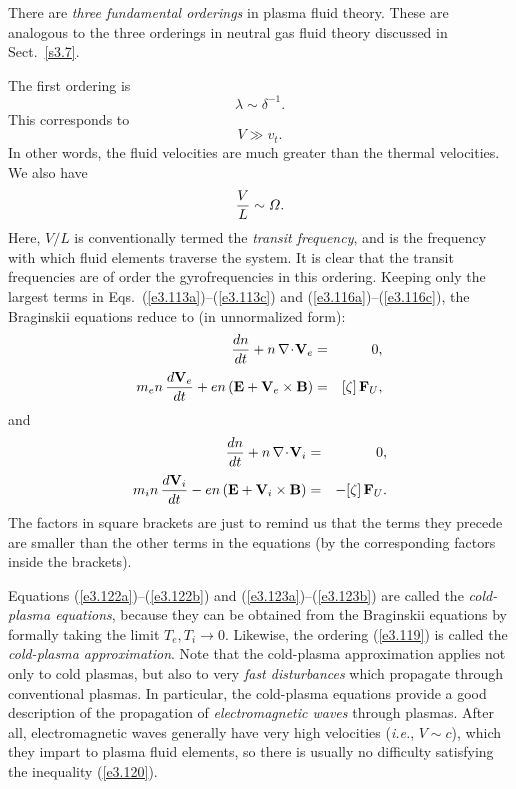 There are {\em three fundamental orderings}\/  in plasma fluid theory. These are
analogous to the three orderings in neutral gas fluid theory discussed in Sect.~\ref{s3.7}.

The first ordering is
\begin{equation}\label{e3.119}
\lambda \sim \delta^{-1}.
\end{equation}
This corresponds to
\begin{equation}\label{e3.120}
V\gg v_t.
\end{equation}
In other words, the fluid velocities are much greater than the 
thermal velocities. We also have
\begin{equation}\label{e3.121}
\frac{V}{L} \sim {\mit\Omega}.
\end{equation}
Here, $V/L$ is conventionally termed the {\em transit frequency}, and is
the frequency with which fluid elements traverse the system. It is clear
that the transit frequencies are of order the gyrofrequencies
in this ordering. Keeping only the largest terms in Eqs.~(\ref{e3.113a})--(\ref{e3.113c}) and
(\ref{e3.116a})--(\ref{e3.116c}), the Braginskii equations reduce to (in unnormalized form):
\begin{eqnarray}\label{e3.122a}
\frac{dn}{dt} + n\,\nabla\!\cdot\!{\bf V}_e &=& 0,\\[0.5ex]
m_e n\,\frac{d {\bf V}_e}{dt}  + e n\,
({\bf E} + {\bf V}_e\times {\bf B})& =& [\zeta]\,{\bf F}_U,\label{e3.122b}
\end{eqnarray}
and
\begin{eqnarray}\label{e3.123a}
\frac{dn}{dt} + n\,\nabla\!\cdot\!{\bf V}_i &=& 0,\\[0.5ex]
m_i n\,\frac{d {\bf V}_i}{dt}  - e n\,
({\bf E} + {\bf V}_i\times {\bf B})& =&- [\zeta]\,{\bf F}_U.\label{e3.123b}
\end{eqnarray}
The factors in square brackets are just to remind us that the terms they precede
are  smaller than the other terms in the equations (by the 
corresponding factors inside
the  
brackets). 

Equations (\ref{e3.122a})--(\ref{e3.122b}) and (\ref{e3.123a})--(\ref{e3.123b}) are called the {\em cold-plasma equations}, because
they can be obtained from the Braginskii equations by formally taking the
limit $T_e, T_i\rightarrow 0$. Likewise, the ordering (\ref{e3.119}) is called
the {\em cold-plasma approximation}. Note that the cold-plasma approximation
applies not only to cold plasmas, but also to very {\em fast disturbances}\/  which
propagate through conventional plasmas. In particular,
the cold-plasma equations provide a good description of the propagation
of {\em electromagnetic waves}\/ through plasmas. After all, electromagnetic
waves generally have very high velocities ({\em i.e.}, $V\sim c$), 
which they impart to
plasma fluid elements, so there is usually
no difficulty satisfying the inequality (\ref{e3.120}). 

